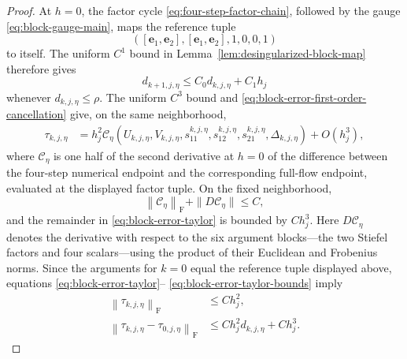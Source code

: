 \documentclass[10pt,a4paper]{amsart}
\numberwithin{equation}{section}
\newcommand{\F}{\mathrm F}
\newcommand{\norm}[1]{\left\lVert #1\right\rVert}
\begin{document}
\begin{proof}
At $h=0$, the factor cycle
\eqref{eq:four-step-factor-chain}, followed by the gauge
\eqref{eq:block-gauge-main}, maps the reference tuple
\[
 ([\boldsymbol e_1,\boldsymbol e_2],
  [\boldsymbol e_1,\boldsymbol e_2],1,0,0,1)
\]
to itself.  The uniform $C^1$ bound in
Lemma~\ref{lem:desingularized-block-map} therefore gives
\begin{equation}\label{eq:block-factor-distance-recurrence}
 d_{k+1,j,\eta}
 \le C_0d_{k,j,\eta}+C_1h_j
\end{equation}
whenever $d_{k,j,\eta}\le\rho$.
The uniform $C^3$ bound and
\eqref{eq:block-error-first-order-cancellation} give, on the same
neighborhood,
\begin{align}
 \tau_{k,j,\eta}
 &=h_j^2\mathcal C_\eta
   (U_{k,j,\eta},V_{k,j,\eta},s_{11}^{k,j,\eta},
    s_{12}^{k,j,\eta},s_{21}^{k,j,\eta},\Delta_{k,j,\eta})
   +O(h_j^3),
 \label{eq:block-error-taylor}
\end{align}
where $\mathcal C_\eta$ is one half of the second derivative at $h=0$
of the difference between the four-step numerical endpoint and the
corresponding full-flow endpoint, evaluated at the displayed factor
tuple.  On the fixed neighborhood,
\begin{equation}\label{eq:block-error-taylor-bounds}
 \norm{\mathcal C_\eta}_{\F}
 +\|D\mathcal C_\eta\|\le C,
\end{equation}
and the remainder in \eqref{eq:block-error-taylor} is bounded by
$Ch_j^3$.
Here $D\mathcal C_\eta$ denotes the derivative with respect to the six
argument blocks---the two Stiefel factors and four scalars---using the
product of their Euclidean and Frobenius norms.  Since the arguments for
$k=0$ equal the reference
tuple displayed above,
equations \eqref{eq:block-error-taylor}--
\eqref{eq:block-error-taylor-bounds} imply
\begin{align}
 \norm{\tau_{k,j,\eta}}_{\F}
 &\le Ch_j^2,
 \label{eq:block-error-direct-bound}\\
 \norm{\tau_{k,j,\eta}-\tau_{0,j,\eta}}_{\F}
 &\le Ch_j^2d_{k,j,\eta}+Ch_j^3.
 \label{eq:block-error-start-dependence}
\end{align}


\end{proof}
\end{document}
